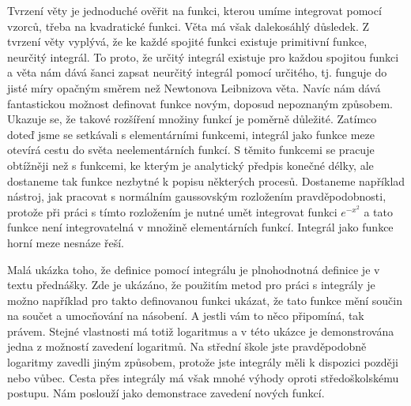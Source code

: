 \documentclass[12pt]{article}
\begin{document}
Tvrzení věty je jednoduché ověřit na funkci, kterou umíme integrovat pomocí vzorců, třeba na kvadratické funkci. Věta má však dalekosáhlý důsledek. Z tvrzení věty vyplývá, že ke každé spojité funkci existuje primitivní funkce, neurčitý integrál. To proto, že určitý integrál existuje pro každou spojitou funkci a věta nám dává šanci zapsat neurčitý integrál pomocí určitého, tj. funguje do jisté míry opačným směrem než Newtonova Leibnizova věta. Navíc nám dává fantastickou možnost definovat funkce novým, doposud nepoznaným způsobem. Ukazuje se, že takové rozšíření množiny funkcí je poměrně důležité. Zatímco doteď jsme se setkávali s elementárními funkcemi, integrál jako funkce meze otevírá cestu do světa neelementárních funkcí. S těmito funkcemi se pracuje obtížněji než s funkcemi, ke kterým je analytický předpis konečné délky, ale dostaneme tak funkce nezbytné k popisu některých procesů. Dostaneme například nástroj, jak pracovat s normálním gaussovským rozložením pravděpodobnosti, protože při práci s tímto rozložením je nutné umět integrovat funkci $e^{-x^2}$ a tato funkce není integrovatelná v množině elementárních funkcí. Integrál jako funkce horní meze nesnáze řeší.

Malá ukázka toho, že definice pomocí integrálu je plnohodnotná definice je v textu přednášky. Zde je ukázáno, že použitím metod pro práci s integrály je možno například pro takto definovanou funkci ukázat, že tato funkce mění součin na součet a umocňování na násobení. A jestli vám to něco připomíná, tak právem. Stejné vlastnosti má totiž logaritmus a v této ukázce je demonstrována jedna z možností zavedení logaritmů. Na střední škole jste pravděpodobně logaritmy zavedli jiným způsobem, protože jste integrály měli k dispozici později nebo vůbec. Cesta přes integrály má však mnohé výhody oproti středoškolskému postupu. Nám poslouží jako demonstrace zavedení nových funkcí. 
\end{document}
